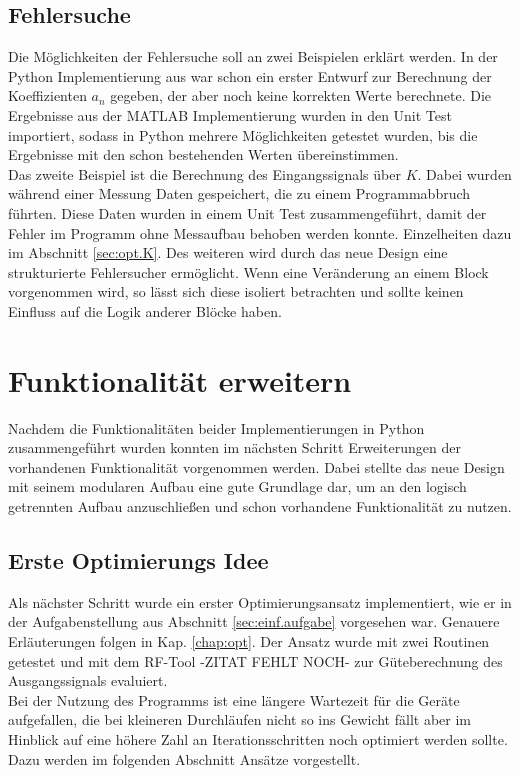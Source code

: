 \documentclass[../Report.tex]{subfiles}
\begin{document}
\subsection*{Fehlersuche}
\label{sec:vorg.fehlersuche}
Die Möglichkeiten der Fehlersuche soll an zwei Beispielen erklärt werden. In der Python Implementierung aus \cite{PJS_Denys} war schon ein erster Entwurf zur Berechnung der Koeffizienten $a_n$ gegeben, der aber noch keine korrekten Werte berechnete. Die Ergebnisse aus der MATLAB Implementierung wurden in den Unit Test importiert, sodass in Python mehrere Möglichkeiten getestet wurden, bis die Ergebnisse mit den schon bestehenden Werten übereinstimmen. \\
Das zweite Beispiel ist die Berechnung des Eingangssignals über $K$. Dabei wurden während einer Messung Daten gespeichert, die zu einem Programmabbruch führten. Diese Daten wurden in einem Unit Test zusammengeführt, damit der Fehler im Programm ohne Messaufbau behoben werden konnte. Einzelheiten dazu im Abschnitt \ref{sec:opt.K}.
Des weiteren wird durch das neue Design eine strukturierte Fehlersucher ermöglicht. Wenn eine Veränderung an einem Block vorgenommen wird, so lässt sich diese isoliert betrachten und sollte keinen Einfluss auf die Logik anderer Blöcke haben.

\section[Funktionalität erweitern]{Funktionalität erweitern}
\label{sec:vorg.erweiterung}
Nachdem die Funktionalitäten beider Implementierungen in Python zusammengeführt wurden konnten im nächsten Schritt Erweiterungen der vorhandenen Funktionalität vorgenommen werden. Dabei stellte das neue Design mit seinem modularen Aufbau eine gute Grundlage dar, um an den logisch getrennten Aufbau anzuschließen und schon vorhandene Funktionalität zu nutzen.
\subsection{Erste Optimierungs Idee}
\label{sec:vorg.optimierung}
Als nächster Schritt wurde ein erster Optimierungsansatz implementiert, wie er in der Aufgabenstellung aus Abschnitt \ref{sec:einf.aufgabe} vorgesehen war. Genauere Erläuterungen folgen in Kap. \ref{chap:opt}. Der Ansatz wurde mit zwei Routinen getestet und mit dem RF-Tool -ZITAT FEHLT NOCH- zur Güteberechnung des Ausgangssignals evaluiert. \\
Bei der Nutzung des Programms ist eine längere Wartezeit für die Geräte aufgefallen, die bei kleineren Durchläufen nicht so ins Gewicht fällt aber im Hinblick auf eine höhere Zahl an Iterationsschritten noch optimiert werden sollte. Dazu werden im folgenden Abschnitt Ansätze vorgestellt.
\end{document}
